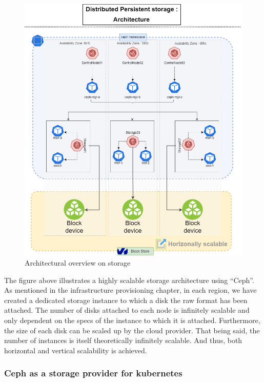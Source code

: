 \begin{figure}[H]\centering
\includegraphics[width=1.0\textwidth,angle=00]{assets/f26.png}
\caption{Architectural overview on storage}
\label{fig:Architectural overview on storage}
\end{figure}

The figure above illustrates a highly scalable storage architecture using “Ceph”. As mentioned in the infrastructure provisioning chapter, in each region, we have created a dedicated storage instance to which a disk the raw format has been attached. The number of disks attached to each node is infinitely scalable and only dependent on the specs of the instance to which it is attached. Furthermore, the size of each disk can be scaled up by the cloud provider. That being said, the number of instances is itself theoretically infinitely scalable. And thus, both horizontal and vertical scalability is achieved. 

\subsubsection{Ceph as a storage provider for kubernetes }

